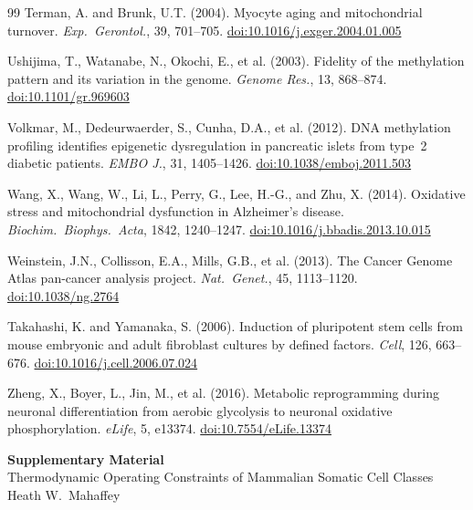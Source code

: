 \documentclass[12pt,a4paper]{article}
\newcommand{\doi}[1]{\href{https://doi.org/#1}{doi:#1}}
\begin{document}
\begin{thebibliography}{99}
Terman, A. and Brunk, U.T. (2004).
Myocyte aging and mitochondrial turnover.
\textit{Exp.\ Gerontol.}, 39, 701--705.
\doi{10.1016/j.exger.2004.01.005}

Ushijima, T., Watanabe, N., Okochi, E., et al. (2003).
Fidelity of the methylation pattern and its variation in the genome.
\textit{Genome Res.}, 13, 868--874.
\doi{10.1101/gr.969603}

Volkmar, M., Dedeurwaerder, S., Cunha, D.A., et al. (2012).
DNA methylation profiling identifies epigenetic dysregulation in pancreatic islets from type~2 diabetic patients.
\textit{EMBO J.}, 31, 1405--1426.
\doi{10.1038/emboj.2011.503}

Wang, X., Wang, W., Li, L., Perry, G., Lee, H.-G., and Zhu, X. (2014).
Oxidative stress and mitochondrial dysfunction in Alzheimer's disease.
\textit{Biochim.\ Biophys.\ Acta}, 1842, 1240--1247.
\doi{10.1016/j.bbadis.2013.10.015}

Weinstein, J.N., Collisson, E.A., Mills, G.B., et al. (2013).
The Cancer Genome Atlas pan-cancer analysis project.
\textit{Nat.\ Genet.}, 45, 1113--1120.
\doi{10.1038/ng.2764}

Takahashi, K. and Yamanaka, S. (2006).
Induction of pluripotent stem cells from mouse embryonic and adult fibroblast cultures by defined factors.
\textit{Cell}, 126, 663--676.
\doi{10.1016/j.cell.2006.07.024}

Zheng, X., Boyer, L., Jin, M., et al. (2016).
Metabolic reprogramming during neuronal differentiation from aerobic glycolysis to neuronal oxidative phosphorylation.
\textit{eLife}, 5, e13374.
\doi{10.7554/eLife.13374}

\end{thebibliography}


\clearpage
\appendix
\renewcommand{\thesection}{S\arabic{section}}
\renewcommand{\thetable}{S\arabic{table}}
\setcounter{section}{0}
\setcounter{table}{0}

\begin{center}
{\large\bfseries\color{deepblue} Supplementary Material}\\[6pt]
{\normalsize Thermodynamic Operating Constraints of Mammalian Somatic Cell Classes}\\
{\small Heath W.\ Mahaffey}
\end{center}
\end{document}
